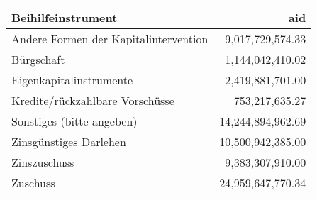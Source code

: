 \begin{tabular}{lr}
\toprule
                   Beihilfeinstrument &               aid \\
\midrule
Andere Formen der Kapitalintervention &  9,017,729,574.33 \\
                           Bürgschaft &  1,144,042,410.02 \\
              Eigenkapitalinstrumente &  2,419,881,701.00 \\
      Kredite/rückzahlbare Vorschüsse &    753,217,635.27 \\
            Sonstiges (bitte angeben) & 14,244,894,962.69 \\
               Zinsgünstiges Darlehen & 10,500,942,385.00 \\
                         Zinszuschuss &  9,383,307,910.00 \\
                             Zuschuss & 24,959,647,770.34 \\
\bottomrule
\end{tabular}
